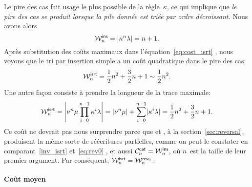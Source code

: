 Le pire des cas fait usage le plus possible de la règle~\(\kappa\), ce
qui implique que \emph{le pire des cas se produit lorsque la pile
  donnée est triée par ordre décroissant.}  Nous avons
alors
\begin{equation*}
\W{\fun{ins}}{n} = \len{\kappa^n\lambda} = n + 1.
\end{equation*}
Après substitution des coûts maximaux dans
l'équation~\eqref{eq:cost_isrt} , nous voyons
que le tri par insertion simple a un coût quadratique dans le pire des
cas:
\begin{equation*}
\W{\fun{isrt}}{n} = \frac{1}{2}{n^2} + \frac{3}{2}{n} + 1
\sim \frac{1}{2}{n^2}.
\end{equation*}
Une autre façon consiste à prendre la longueur de la trace maximale:
\begin{equation*}
\W{\fun{isrt}}{n}
 = \left\lvert\nu^n\mu \prod_{i=0}^{n-1}\kappa^i\lambda\right\rvert
 = \len{\nu^n\mu} + \sum_{i=0}^{n-1}\len{\kappa^i\lambda}
 = \frac{1}{2}{n^2} + \frac{3}{2}{n} + 1.
\end{equation*}
Ce coût ne devrait pas nous surprendre parce que
 et
, à la
section~\ref{sec:reversal}, produisent la même sorte de réécritures
partielles, comme on peut le constater en comparant~\eqref{inv_isrt}
 et~\eqref{eq:rev0} , et aussi
\(\C{\fun{cat}}{n} =
\W{\fun{ins}}{n}\),
où \(n\)~est la taille de leur premier argument. Par conséquent,
\(\W{\fun{isrt}}{n} = \W{\fun{rev}_0}{n}\).

\paragraph{Coût moyen}
\label{par:ave_isrt}

